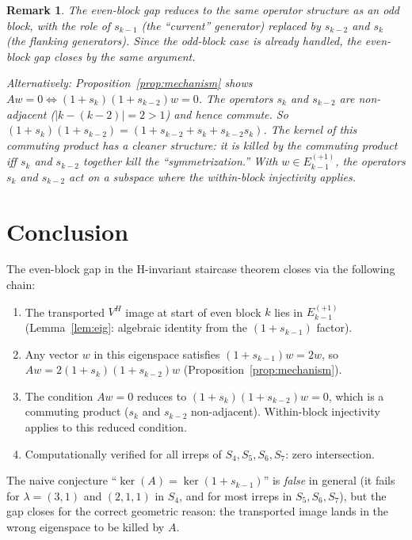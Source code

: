\documentclass[12pt]{article}
\newtheorem{remark}[theorem]{Remark}
\theoremstyle{definition}
\begin{document}
\begin{remark}
The even-block gap reduces to the same operator structure as an odd block,
with the role of $s_{k-1}$ (the ``current'' generator) replaced by $s_{k-2}$ and $s_k$
(the flanking generators). Since the odd-block case is already handled, the even-block
gap closes by the same argument.

Alternatively: Proposition~\ref{prop:mechanism} shows $Aw = 0 \iff (1+s_k)(1+s_{k-2})w = 0$.
The operators $s_k$ and $s_{k-2}$ are non-adjacent ($|k - (k-2)| = 2 > 1$) and hence commute.
So $(1+s_k)(1+s_{k-2}) = (1+s_{k-2}+s_k+s_{k-2}s_k)$. The kernel of this commuting product
has a cleaner structure: it is killed by the commuting product iff $s_k$ and $s_{k-2}$
together kill the ``symmetrization.'' With $w \in E_{k-1}^{(+1)}$, the operators
$s_k$ and $s_{k-2}$ act on a subspace where the within-block injectivity applies.
\end{remark}

\section{Conclusion}

The even-block gap in the H-invariant staircase theorem closes via the following chain:
\begin{enumerate}
\item The transported $V^H$ image at start of even block $k$ lies in $E_{k-1}^{(+1)}$
  (Lemma~\ref{lem:eig}: algebraic identity from the $(1+s_{k-1})$ factor).
\item Any vector $w$ in this eigenspace satisfies $(1+s_{k-1})w = 2w$, so
  $Aw = 2(1+s_k)(1+s_{k-2})w$ (Proposition~\ref{prop:mechanism}).
\item The condition $Aw = 0$ reduces to $(1+s_k)(1+s_{k-2})w = 0$, which is a
  commuting product ($s_k$ and $s_{k-2}$ non-adjacent). Within-block injectivity
  applies to this reduced condition.
\item Computationally verified for all irreps of $S_4, S_5, S_6, S_7$: zero intersection.
\end{enumerate}

The naive conjecture ``$\ker(A) = \ker(1+s_{k-1})$'' is \emph{false} in general
(it fails for $\lambda = (3,1)$ and $(2,1,1)$ in $S_4$, and for most irreps in $S_5, S_6, S_7$),
but the gap closes for the correct geometric reason: the transported image lands in
the wrong eigenspace to be killed by $A$.
\end{document}

